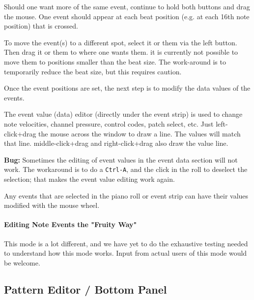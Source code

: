    Should one want more of the same event, continue to hold both buttons and
   drag the mouse.  One event should appear at each beat position (e.g. at
   each 16th note position) that is crossed.

   To move the event(s) to a different spot, select it or them via the left
   button.  Then drag it or them to where one wants them.
   it is currently not possible to move them to positions smaller than the
   beat size.  The work-around is to temporarily reduce the beat size,
   but this requires caution.

   Once the event positions are set, the next step is to modify the
   data values of the events.

	The event value (data) editor (directly under the event strip) is used 
	to change note velocities, channel pressure, control codes,
	patch select, etc.
   Just left-click+drag the mouse across the window to draw a line.  The
   values will match that line.  
   middle-click+drag and right-click+drag also
   draw the value line.

   \textbf{Bug:}
   Sometimes the editing of event values in the event data section will not work.
   The workaround is to do a \texttt{Ctrl-A}, and the click in the roll
   to deselect the selection; that makes the event value editing work again.
   
   Any events that are selected in the piano roll or event strip can have
   their values modified with the mouse wheel.

\paragraph{Editing Note Events the "Fruity Way"}
\label{paragraph:seq64_pattern_editor_note_events_fruity}

   This mode is a lot different, and we have yet to do the exhaustive testing
   needed to understand how this mode works.  Input from actual users of this
   mode would be welcome.

\subsection{Pattern Editor / Bottom Panel}
\label{subsec:seq64_pattern_editor_bottom}


